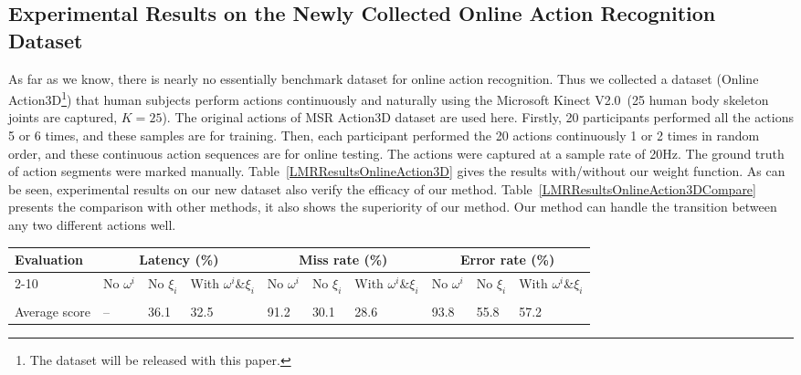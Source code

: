 \documentclass[sigconf]{acmart}
\begin{document}
\subsection{Experimental Results on the Newly Collected Online Action Recognition Dataset}
As far as we know, there is nearly no essentially benchmark dataset for online action recognition. %
Thus we collected a dataset (Online Action3D\footnote{The dataset will be released with this paper.}) that human subjects perform actions continuously and naturally using the Microsoft Kinect V2.0~\texttrademark(25 human body skeleton joints are captured, $K=25$). The original actions of MSR Action3D dataset are used here. Firstly, 20 participants performed all the actions 5 or 6 times, and these samples are for training. Then, each participant performed the 20 actions continuously 1 or 2 times in random order, and these continuous action sequences are for online testing. The actions were captured at a sample rate of 20Hz. The ground truth of action segments were marked manually. Table~\ref{LMRResultsOnlineAction3D} gives the results with/without our weight function. As can be seen, experimental results on our new dataset also verify the efficacy of our method. Table~\ref{LMRResultsOnlineAction3DCompare} presents the comparison with other methods, it also shows the superiority of our method. Our method can handle the transition between any two different actions well.

\begin{table*}[!htb]
\caption{Average latency, miss rate and error rate with/without weighting of all the actions on Online Action3D dataset.}
\label{LMRResultsOnlineAction3D}\centering
\begin{tabular}{|p{3.0cm}<{\centering}|p{0.6cm}<{\centering}|p{0.6cm}<{\centering}|p{1.0cm}<{\centering}|p{0.6cm}<{\centering}|p{0.6cm}<{\centering}|p{1.0cm}<{\centering}|p{0.6cm}<{\centering}|p{0.6cm}<{\centering}|p{1.0cm}<{\centering}|}
\hline
\multirow{2}{*}{Evaluation} & \multicolumn{3}{c|}{Latency (\%)} & \multicolumn{3}{c|}{Miss rate (\%)} & \multicolumn{3}{c|}{Error rate (\%)}\\
\cline{2-10}
& No $\omega^i$ & No $\xi_i$ & With $\omega^i$\&$\xi_i$ & No $\omega^i$ & No $\xi_i$ & With $\omega^i$\&$\xi_i$ & No $\omega^i$ & No $\xi_i$ & With $\omega^i$\&$\xi_i$ \\
&&&&&&&&&\\
\hline
Average score & --   &  36.1  &  32.5 & 91.2  & 30.1  &  28.6  & 93.8  & 55.8  & 57.2 \\
\hline
\end{tabular}
\end{table*}
\end{document}
